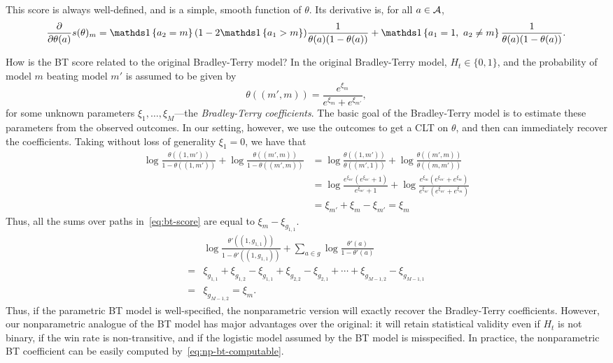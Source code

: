 \documentclass{article}
\begin{document}
This score is always well-defined, and is a simple, smooth function of $\theta$.
Its derivative is, for all $a \in \mathcal{A}$,
\begin{equation}
    \label{eq:bt-score-grad}
    \frac{\partial}{\partial \theta(a)} s(\theta)_m = \ind{a_2 = m}(1-2\ind{a_1 > m})\frac{1}{\theta(a)(1-\theta(a))} + \ind{a_1 = 1,\ a_2 \neq m}\frac{1}{\theta(a)(1-\theta(a))}.
\end{equation}

How is the BT score related to the original Bradley-Terry model?
In the original Bradley-Terry model, $H_t \in \{0, 1\}$, and the probability of model $m$ beating model $m'$ is assumed to be given by
\begin{equation}
    \label{eq:bt-prob}
    \theta((m',m)) = \frac{e^{\xi_m}}{e^{\xi_m} + e^{\xi_{m'}}}, 
\end{equation}
for some unknown parameters $\xi_1, \ldots, \xi_M$---the \emph{Bradley-Terry coefficients}.
The basic goal of the Bradley-Terry model is to estimate these parameters from the observed outcomes.
In our setting, however, we use the outcomes to get a CLT on $\theta$, and then can immediately recover the coefficients.
Taking without loss of generality $\xi_{1} = 0$, we have that
\begin{align}
    \log\frac{\theta((1,m'))}{1-\theta((1,m'))}+\log \frac{\theta((m', m))}{1-\theta((m', m))} &= \log\frac{\theta((1,m'))}{\theta((m',1))} + \log\frac{\theta((m',m))}{\theta((m,m'))}\\
    &= \log \frac{e^{\xi_{m'}}(e^{\xi_{m'}}+ 1)}{e^{\xi_{m'}}+1} + \log \frac{e^{\xi_m}(e^{\xi_{m'}}+ e^{\xi_m})}{e^{\xi_{m'}}(e^{\xi_{m'}}+ e^{\xi_m})} \\
    &= \xi_{m'} + \xi_m - \xi_{m'} = \xi_m
\end{align}
Thus, all the sums over paths in~\eqref{eq:bt-score} are equal to $\xi_m - \xi_{g_{1,1}}$.
\begin{align}
    &\log \frac{\theta'((1,g_{1,1}))}{1-\theta'((1,g_{1,1}))} + \sum\limits_{a \in g}\log \frac{\theta'(a)}{1-\theta'(a)} \\
    = & \xi_{g_{1,1}} + \xi_{g_{1,2}} - \xi_{g_{1,1}} + \xi_{g_{2,2}} - \xi_{g_{2,1}} + \cdots + \xi_{g_{M-1,2}} - \xi_{g_{M-1,1}} \\
    = & \xi_{g_{M-1,2}} = \xi_m.
\end{align}
Thus, if the parametric BT model is well-specified, the nonparametric version will exactly recover the Bradley-Terry coefficients.
However, our nonparametric analogue of the BT model has major advantages over the original: it will retain statistical validity even if $H_t$ is not binary, if the win rate is non-transitive, and if the logistic model assumed by the BT model is misspecified.
In practice, the nonparametric BT coefficient can be easily computed by~\eqref{eq:np-bt-computable}.
\end{document}
